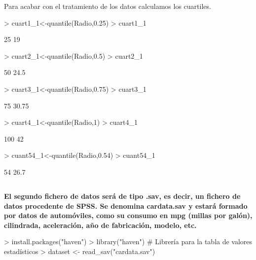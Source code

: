 \documentclass[a4paper]{article}
\begin{document}
Para acabar con el tratamiento de los datos calculamos los cuartiles.
\begin{Schunk}
\begin{Sinput}
> cuart1_1<-quantile(Radio,0.25)
> cuart1_1
\end{Sinput}
\begin{Soutput}
25% 
 19 
\end{Soutput}
\begin{Sinput}
> cuart2_1<-quantile(Radio,0.5)
> cuart2_1
\end{Sinput}
\begin{Soutput}
 50% 
24.5 
\end{Soutput}
\begin{Sinput}
> cuart3_1<-quantile(Radio,0.75)
> cuart3_1
\end{Sinput}
\begin{Soutput}
  75% 
30.75 
\end{Soutput}
\begin{Sinput}
> cuart4_1<-quantile(Radio,1)
> cuart4_1
\end{Sinput}
\begin{Soutput}
100% 
  42 
\end{Soutput}
\begin{Sinput}
> cuant54_1<-quantile(Radio,0.54)
> cuant54_1
\end{Sinput}
\begin{Soutput}
 54% 
26.7 
\end{Soutput}
\end{Schunk}

\subsection{}
\textbf{El segundo fichero de datos será de tipo .sav, es decir, un fichero de datos procedente de SPSS. Se denomina cardata.sav y estará formado por datos de automóviles, como su consumo en mpg (millas por galón), cilindrada, aceleración, año de fabricación, modelo, etc.}


\begin{Schunk}
\begin{Sinput}
> install.packages("haven")
> library("haven")      # Librería para la tabla de valores estadísticos
> dataset <- read_sav("cardata.sav")
\end{Sinput}
\end{Schunk}
\end{document}

